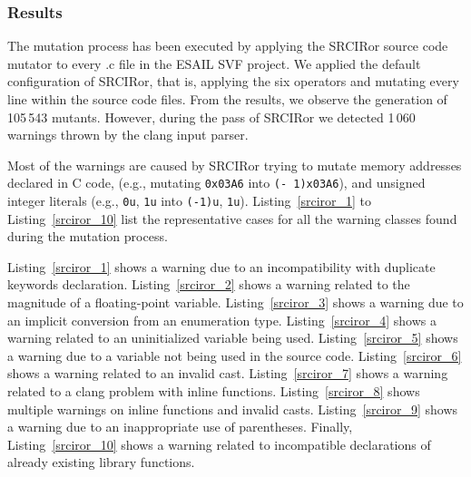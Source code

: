 
\subsubsection{Results}

The mutation process has been executed by applying the SRCIRor source code mutator to every .c file in the ESAIL SVF project. We applied the default configuration of SRCIRor, that is, applying the six operators and mutating every line within the source code files.
From the results, we observe the generation of 105\,543 mutants. However, during the pass of SRCIRor we detected 1\,060 warnings thrown by the clang input parser.

Most of the warnings are caused by SRCIRor trying to mutate memory addresses declared in C code, (e.g., mutating \texttt{0x03A6} into \texttt{(- 1)x03A6}), and unsigned integer literals (e.g., \texttt{0u}, \texttt{1u} into \texttt{(-1)u}, \texttt{1u}).
Listing~\ref{srciror_1} to Listing~\ref{srciror_10} list the representative cases for all the warning classes found during the mutation process.

Listing~\ref{srciror_1} shows a warning due to an incompatibility with duplicate keywords declaration.
Listing~\ref{srciror_2} shows a warning related to the magnitude of a floating-point variable.
Listing~\ref{srciror_3} shows a warning due to an implicit conversion from an enumeration type.
Listing~\ref{srciror_4} shows a warning related to an uninitialized variable being used.
Listing~\ref{srciror_5} shows a warning due to a variable not being used in the source code.
Listing~\ref{srciror_6} shows a warning related to an invalid cast.
Listing~\ref{srciror_7} shows a warning related to a clang problem with inline functions.
Listing~\ref{srciror_8} shows multiple warnings on inline functions and invalid casts.
Listing~\ref{srciror_9} shows a warning due to an inappropriate use of parentheses. Finally, Listing~\ref{srciror_10} shows a warning related to incompatible declarations of already existing library functions.

